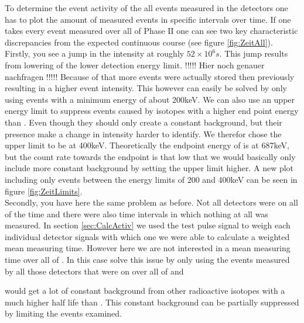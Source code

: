 To determine the event activity of the all events measured in the detectors one has to plot the amount of measured events in specific intervals over time.
If one takes every event measured over all of Phase II one can see two key characteristic discrepancies from the expected continuous course (see figure \ref{fig:ZeitAll}).
\\

Firstly, you see a jump in the intensity at roughly \(52\times10^6\unit{s}\).
This jump results from lowering of the lower detection energy limit. !!!!! Hier noch genauer nachfragen !!!!!
Because of that more events were actually stored then previously resulting in a higher event intensity.
This however can easily be solved by only using events with a minimum energy of about 200keV.
We can also use an upper energy limit to suppress events caused by isotopes with a higher end point energy than \Kr.
Even though they should only create a constant background, but their presence make a change in intensity harder to identify.
We therefor chose the upper limit to be at 400keV.
Theoretically the endpoint energy of \Kr is at 687keV, but the count rate towards the endpoint is that low that we would basically only include more constant background by setting the upper limit higher.
A new plot including only events between the energy limits of 200 and 400keV can be seen in figure \ref{fig:ZeitLimits}.
\\

Secondly, you have here the same problem as before.
Not all detectors were on all of the time and there were also time intervals in which nothing at all was measured.
In section \ref{sec:CalcActiv} we used the test pulse signal to weigh each individual detector signals with which one we were able to calculate a weighted mean measuring time.
However here we are not interested in a mean measuring time over all of \PII.
In this case solve this issue by only using the events measured by all those detectors that were on over all of \PII and 


would get a lot of constant background from other radioactive isotopes with a much higher half life than \Kr.
This constant background can be partially suppressed by limiting the events examined.


